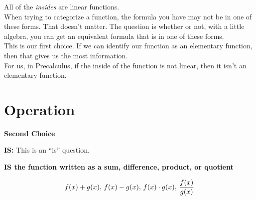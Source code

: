 \documentclass{ximera}
\begin{document}
All of the \textit{insides} are linear functions. \\


When trying to categorize a function, the formula you have may not be in one of these forms.  That doesn't matter.  The question is whether or not, with a little algebra, you can get an equivalent formula that is in one of these forms. \\


This is our first choice.  If we can identify our function as an elementary function, then that gives us the most information. \\


For us, in Precalculus, if the inside of the function is not linear, then it isn't an elementary function. \\







































\section{Operation}

\textbf{\textcolor{purple!85!blue}{Second Choice}} 


\textbf{\textcolor{purple!85!blue}{IS:}}   This is an ``is'' question. \\

\begin{center}
\textbf{\textcolor{red!80!black}{IS the function written as a sum, difference, product, or quotient}}

\end{center}



\[
f(x) + g(x), \, \\ \, f(x) - g(x), \, \\ \, f(x) \cdot g(x), \, \\ \,  \frac{f(x)}{g(x)}
\]
\end{document}
